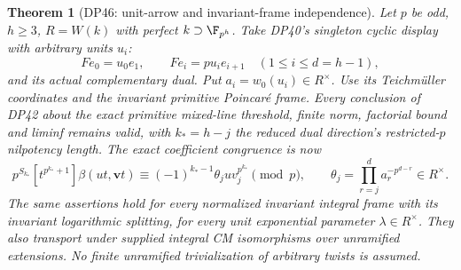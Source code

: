 \documentclass[11pt,a4paper]{article}
\newtheorem{theorem}{Theorem}[section]
\theoremstyle{definition}\newtheorem{remark}[theorem]{Remark}
\begin{document}
\begin{theorem}[DP46: unit-arrow and invariant-frame independence]\label{DP46}
Let $p$ be odd, $h\ge3$, $R=W(k)$ with perfect $k\supset\F_{p^h}$.
Take DP40's singleton cyclic display with arbitrary units $u_i$:
\[
 Fe_0=u_0e_1,\qquad Fe_i=pu_ie_{i+1}\quad(1\le i\le d=h-1),
\]
and its actual complementary dual. Put $a_i=w_0(u_i)\in R^\times$.
Use its Teichm\"uller coordinates and the invariant primitive Poincar\'e frame.
Every conclusion of DP42 about the exact primitive mixed-line threshold, finite norm, factorial bound and liminf remains valid, with
$k_*=h-j$ the reduced dual direction's restricted-$p$ nilpotency length.
The exact coefficient congruence is now
\[
 p^{S_{k_*}}[t^{p^{k_*}+1}]\beta(ut,\mathbf vt)
 \equiv(-1)^{k_*-1}\theta_j u v_j^{p^{k_*}}\pmod p,\qquad
 \theta_j=\prod_{r=j}^{d}a_r^{-p^{d-r}}\in R^\times.
\]
The same assertions hold for every normalized invariant integral frame with its invariant logarithmic splitting, for every unit exponential parameter $\lambda\in R^\times$.
They also transport under supplied integral CM isomorphisms over unramified extensions. No finite unramified trivialization of arbitrary twists is assumed.
\end{theorem}
\end{document}

